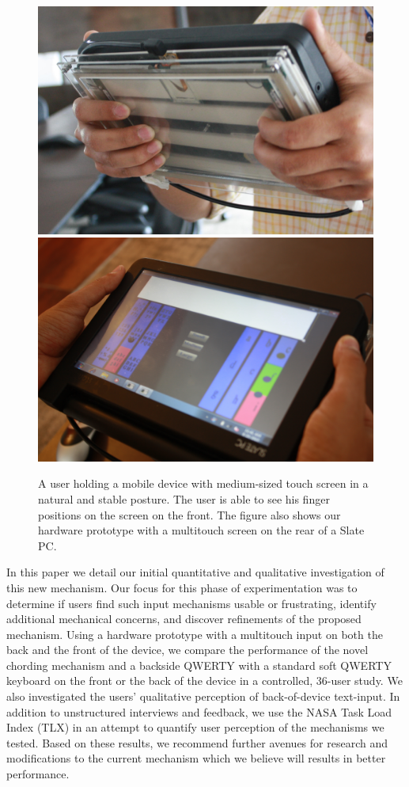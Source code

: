 \begin{figure}
    \includegraphics[scale=0.43]{Figures/natural1.pdf} 
     \includegraphics[scale=0.43]{Figures/natural2.pdf} 
     \caption{A user holding a mobile device with medium-sized touch
       screen in a natural and stable posture. The user is able to see
       his finger positions on the screen on the front. The figure
       also shows our hardware prototype with a multitouch screen on
       the rear of a Slate PC.}
        \label{fig:natural}
\end{figure}


In this paper we detail our initial quantitative and qualitative
investigation of this new mechanism.  Our focus for this phase of
experimentation was to determine if users find such input mechanisms
usable or frustrating, identify additional mechanical concerns, and
discover refinements of the proposed mechanism.  Using a hardware
prototype with a multitouch input on both the back and the front of
the device, we compare the performance of the novel chording mechanism
and a backside QWERTY with a standard soft QWERTY keyboard on the
front or the back of the device in a controlled, 36-user study.  We
also investigated the users' qualitative perception of back-of-device
text-input. In addition to unstructured interviews and feedback, we
use the NASA Task Load Index (TLX) in an attempt to quantify user
perception of the mechanisms we tested. Based on these results, we
recommend further avenues for research and modifications to the
current mechanism which we believe will results in better performance.

